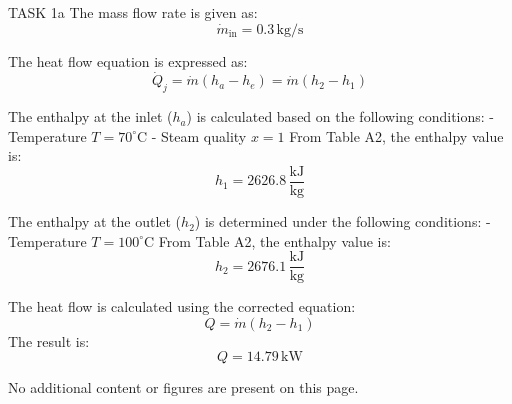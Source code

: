 TASK 1a  
The mass flow rate is given as:  
\[
\dot{m}_{\text{in}} = 0.3 \, \text{kg/s}
\]

The heat flow equation is expressed as:  
\[
\dot{Q}_j = \dot{m}(h_a - h_e) = \dot{m}(h_2 - h_1)
\]

The enthalpy at the inlet (\( h_a \)) is calculated based on the following conditions:  
- Temperature \( T = 70^\circ\text{C} \)  
- Steam quality \( x = 1 \)  
From Table A2, the enthalpy value is:  
\[
h_1 = 2626.8 \, \frac{\text{kJ}}{\text{kg}}
\]

The enthalpy at the outlet (\( h_2 \)) is determined under the following conditions:  
- Temperature \( T = 100^\circ\text{C} \)  
From Table A2, the enthalpy value is:  
\[
h_2 = 2676.1 \, \frac{\text{kJ}}{\text{kg}}
\]

The heat flow is calculated using the corrected equation:  
\[
Q = \dot{m}(h_2 - h_1)
\]  
The result is:  
\[
Q = 14.79 \, \text{kW}
\]

No additional content or figures are present on this page.